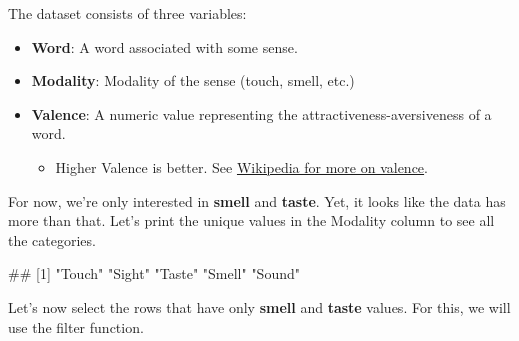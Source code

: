 \documentclass[
]{book}
\newenvironment{Shaded}{\begin{snugshade}}{\end{snugshade}}
\newcommand{\CommentTok}[1]{\textcolor[rgb]{0.56,0.35,0.01}{\textit{#1}}}
\newcommand{\FunctionTok}[1]{\textcolor[rgb]{0.13,0.29,0.53}{\textbf{#1}}}
\newcommand{\NormalTok}[1]{#1}
\newcommand{\OtherTok}[1]{\textcolor[rgb]{0.56,0.35,0.01}{#1}}
\newcommand{\SpecialCharTok}[1]{\textcolor[rgb]{0.81,0.36,0.00}{\textbf{#1}}}
\newcommand{\StringTok}[1]{\textcolor[rgb]{0.31,0.60,0.02}{#1}}
\providecommand{\tightlist}{%
  \setlength{\itemsep}{0pt}\setlength{\parskip}{0pt}}
\begin{document}
The dataset consists of three variables:

\begin{itemize}
\tightlist
\item
  \textbf{Word}: A word associated with some sense.
\item
  \textbf{Modality}: Modality of the sense (touch, smell, etc.)
\item
  \textbf{Valence}: A numeric value representing the attractiveness-aversiveness of a word.

  \begin{itemize}
  \tightlist
  \item
    Higher Valence is better. See \href{https://en.wikipedia.org/wiki/Valence_(psychology)}{Wikipedia for more on valence}.
  \end{itemize}
\end{itemize}

For now, we're only interested in \textbf{smell} and \textbf{taste}. Yet, it looks like the data has more than that. Let's print the unique values in the Modality column to see all the categories.

\begin{Shaded}
\end{Shaded}

\begin{Shaded}
\begin{Highlighting}[]
\NormalTok{\#\# [1] "Touch" "Sight" "Taste" "Smell" "Sound"}
\end{Highlighting}
\end{Shaded}

Let's now select the rows that have only \textbf{smell} and \textbf{taste} values. For this, we will use the filter function.

\begin{Shaded}
\end{Shaded}
\end{document}
